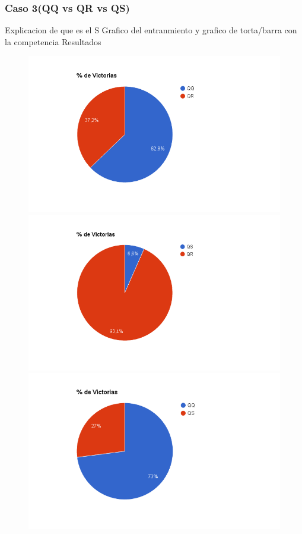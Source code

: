 \documentclass[10pt, a4paper]{article}
\begin{document}
\subsubsection{Caso 3(QQ vs QR vs QS)}

Explicacion de que es el S Grafico del entranmiento y grafico de torta/barra con la competencia Resultados

\begin{figure}[H]
  \begin{minipage}[c]{1\textwidth}
  \includegraphics[scale=0.3]{QQvsQR.png}
  \includegraphics[scale=0.3]{QRvsQS.png}
  \includegraphics[scale=0.3]{QQvsQS.png}
  \end{minipage}
\end{figure}
\end{document}
